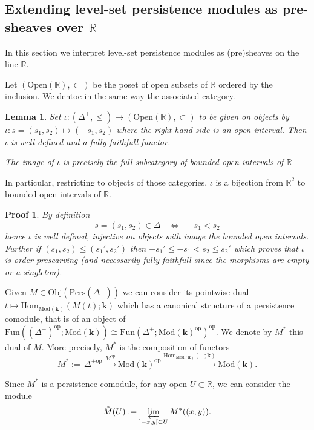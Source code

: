 \documentclass[a4paper, english, 11pt]{article}
\newcommand{\kk}[0]{\textbf{k}}
\newcommand{\Mod}[0]{\text{Mod}}
\newcommand{\Pe}{\text{Pers}}
\newcommand{\0}{\vec{0}}
\newcommand{\R}[0]{\mathbb{R}}
\newcommand{\Obj}[0]{\text{Obj}}
\newcommand{\Ouv}[0]{\mathrm{Open}}
\newcommand{\op}[0]{\text{op}}
\newcommand{\Hom}[0]{\text{Hom}}
\newtheorem*{pf}{Proof} }
\newtheorem{lem}[prop]{Lemma}
\begin{document}
\subsection{Extending level-set persistence modules as pre-sheaves over $\R$}
In this section we interpret level-set persistence modules as (pre)sheaves on the line $\R$. 


 Let $(\Ouv(\R), \subset )$ be the poset of open subsets of $\R$ ordered by the inclusion. We dentoe in the same way the associated category.  
\begin{lem} \label{L:Defiota}Set $\iota: (\Delta^+, \leq)\to (\Ouv(\R), \subset)$ to be given on objects by 
  $\iota: s=(s_1, s_2) \mapsto (-s_1, s_2)$ where the right hand side is an open interval. 
  Then $\iota$ is well defined and a fully faithfull functor.
  
  The image of $\iota$ is precisely the full subcategory of bounded open intervals of $\R$ 
\end{lem}
In particular, restricting to objects of those categories,  $\iota$ is a bijection from $\R^2$ to bounded open intervals of $\R$. 
\begin{pf}
 By definition  $$ s=(s_1, s_2)\in \Delta^+ \;\Longleftrightarrow \;-s_1<s_2$$ hence $\iota$ is well defined, injective on objects with image the bounded open intervals.  Further if $(s_1, s_2)\leq (s_1', s_2')$ then 
 $-s_1'\leq -s_1<s_2\leq s_2'$ which proves that $\iota$ is order presearving (and necessarily fully faithfull since the morphisms are empty or a singleton). 
\end{pf}



Given $M \in \Obj(\Pe(\Delta^+))$ we can consider its pointwise dual $ t\mapsto \Hom_{\Mod(\kk)}(M(t);\kk)$ which has a canonical structure of a persistence comodule, that is of an object of  
$\text{Fun}((\Delta^{+})^{\op}; \Mod(\kk))\cong \text{Fun}(\Delta^+; \Mod(\kk)^{\op})^{\op} $.  We denote by $M^*$ this dual of $M$. More precisely, $M^*$ is the composition of functors
$$M^* :=\, \Delta^{+\op} \stackrel{M^{\op}}\longrightarrow \Mod(\kk)^{\op} \stackrel{\Hom_{\Mod(\kk)}(-;\kk)}\longrightarrow \Mod(\kk). $$

Since $M^*$ is a persistence comodule, for any  open $U \subset \R$, we can consider the module 
\begin{equation}\label{eq:defMtilde} 
\Tilde{M} (U):=  \varprojlim_{]-x,y[\subset U} M^*((x,y)).\end{equation}
                                     
\end{document}
